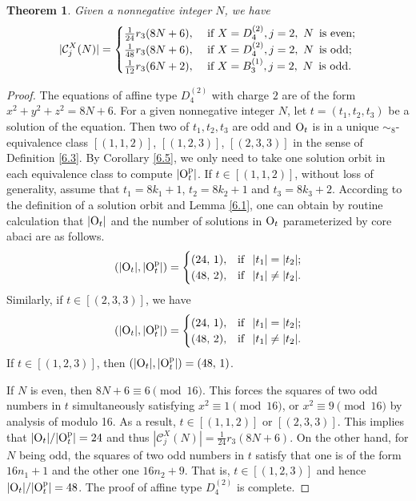 \documentclass[11pt]{amsart}
\theoremstyle{plain}
\numberwithin{equation}{subsection}
\newtheorem{theorem}{Theorem}[section]
\begin{document}
\begin{theorem}\label{6.16}
	Given a nonnegative integer $N$, we have
	$$|\mathcal{C}_j^X(N)|=
	\begin{cases}
		\frac{1}{24}r_3(8N+6),\, & \mbox{\rm if } X=D_4^{(2)}, j=2, \ N \,\ \text{\rm is even}; \\
		\frac{1}{48}r_3(8N+6),\,\, & \mbox{\rm if } X=D_4^{(2)}, j=2, \  N \,\ \text{\rm is odd}; \\
		\frac{1}{12}r_3(6N+2), & \mbox{\rm if } X=B_3^{(1)}, j=2,  \  N \,\ \text{\rm is odd}.
	\end{cases}
	$$
\end{theorem}

\begin{proof}
The equations of affine type $D_4^{(2)}$ with charge $2$ are of the form $x^2+y^2+z^2=8N+6$.
For a given nonnegative integer $N$, let $t=(t_1, t_2, t_3)$ be a solution of the equation.
Then two of $t_1, t_2, t_3$ are odd and ${\rm O}_{t}$ is in a unique $\sim_8$-equivalence class
$[(1, 1, 2)]$, $[(1, 2, 3)]$, $[(2, 3, 3)]$ in the sense of Definition \ref{6.3}.
By Corollary \ref{6.5}, we only need to take one solution orbit in each equivalence class to compute $|{\rm O}_t^{\rm p}|$.
If $t\in [(1, 1, 2)]$, without loss of generality, assume that $t_1=8k_1+1$, $t_2=8k_2+1$ and $t_3=8k_3+2$. 
According to the definition of a solution orbit and Lemma \ref{6.1}, one can obtain by routine calculation 
that $|{\rm O}_t|$ and the number of solutions in ${\rm O}_t$ parameterized by core abaci are as follows.
$$(|{\rm O}_t|, |{\rm O}_t^{\rm p}|)=
\begin{cases}
(24,\,1),  & {\rm if \,\,}  \text{ $|t_1|=|t_2|$}; \\
(48,\,2),  & {\rm if \,\,}  \text{ $|t_1|\neq|t_2|$}.
\end{cases}$$
	Similarly, if $t\in [(2, 3, 3)]$, we have
	$$(|{\rm O}_t|, |{\rm O}_t^{\rm p}|)=
	\begin{cases}
		(24,\,1),  & {\rm if \,\,}  \text{ $|t_1|=|t_2|$}; \\
		(48,\,2),  & {\rm if \,\,}  \text{ $|t_1|\neq|t_2|$}.
	\end{cases}$$
If $t\in [(1, 2, 3)]$, then $(|{\rm O}_t|, |{\rm O}_t^{\rm p}|)=(48, \,1)$.
	
If $N$ is even, then $8N+6\equiv 6 \pmod {16}$. This forces the squares of two odd numbers in $t$ simultaneously satisfying 
$x^2\equiv 1 \pmod{16}$, or $x^2\equiv 9 \pmod{16}$ by analysis of modulo 16. As a result, $t\in [(1, 1, 2)]$ or $[(2, 3, 3)]$.
This implies that $|{\rm O}_t|/ |{\rm O}_t^{\rm p}|=24$ and thus $|\mathcal{C}_j^X(N)|=\frac{1}{24}r_3(8N+6)$.
On the other hand, for $N$ being odd, the squares of two odd numbers in $t$ satisfy that one is of the form $16n_1+1$ and the other one $16n_2+9$.
That is, $t\in [(1, 2, 3)]$ and hence $|{\rm O}_t|/ |{\rm O}_t^{\rm p}|=48$. The proof of affine type $D_4^{(2)}$ is complete.
	

\end{proof}
\end{document}
